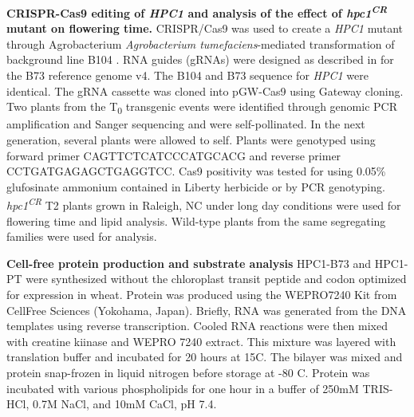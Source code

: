 \documentclass[9pt,twocolumn,twoside,lineno]{biorxiv}
\newcommand{\hpc}{\textit{HPC1}\xspace}
\begin{document}
\textbf{CRISPR-Cas9 editing of \hpc and analysis of the effect of \textit{hpc1\textsuperscript{CR}} mutant on flowering time.}
CRISPR/Cas9 was used to create a \hpc mutant through Agrobacterium \textit{Agrobacterium tumefaciens}-mediated transformation of background line B104 \cite{Wu2020-nq, Char2017-uk}. 
RNA guides (gRNAs) were designed as described in \cite{Brazelton2015-co} for the B73 reference genome v4. 
The B104 and B73 sequence for \hpc were identical. 
The gRNA cassette was cloned into pGW-Cas9 using Gateway cloning. 
Two plants from the T\textsubscript{0} transgenic events were identified through genomic PCR amplification and Sanger sequencing and were self-pollinated. 
In the next generation, several plants were allowed to self.
Plants were genotyped using forward primer CAGTTCTCATCCCATGCACG and reverse primer CCTGATGAGAGCTGAGGTCC.
Cas9 positivity was tested for using 0.05\% glufosinate ammonium contained in Liberty herbicide or by PCR genotyping. 
\textit{hpc1\textsuperscript{CR}} T2 plants grown in Raleigh, NC under long day conditions were used for flowering time and lipid analysis.
Wild-type plants from the same segregating families were used for analysis.

\textbf{Cell-free protein production and substrate analysis}
HPC1-B73 and HPC1-PT were synthesized without the chloroplast transit peptide and codon optimized for expression in wheat. 
Protein was produced using the WEPRO7240 Kit from CellFree Sciences (Yokohama, Japan).
Briefly, RNA was generated from the DNA templates using reverse transcription. 
Cooled RNA reactions were then mixed with creatine kiinase and WEPRO 7240 extract. 
This mixture was layered with translation buffer and incubated for 20 hours at 15\textdegree C.
The bilayer was mixed and protein snap-frozen in liquid nitrogen before storage at -80 \textdegree C.
Protein was incubated with various phospholipids for one hour in a buffer of 250mM TRIS-HCl, 0.7M NaCl, and 10mM CaCl, pH 7.4.
\end{document}
